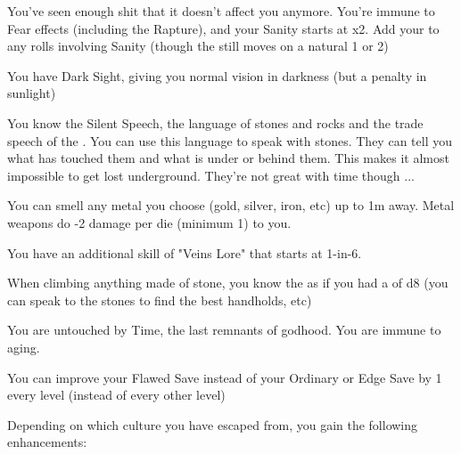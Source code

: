 {  

  You've seen enough shit that it doesn't affect you anymore.  You're immune to Fear effects (including the Rapture), and your Sanity starts at \DCUP x2.  Add your \LVL to any rolls involving Sanity (though the \UD still moves \DCDOWN on a natural 1 or 2)

  You have Dark Sight, giving you normal vision in darkness (but a penalty in sunlight)

  You know the Silent Speech, the language of stones and rocks and the trade speech of the .  You can use this language to speak with stones. They can tell you what has touched them and what is under or behind them.  This makes it almost impossible to get lost underground. They're not great with time though ...

  You can smell any metal you choose (gold, silver, iron, etc) up to 1m away.  Metal weapons do -2 damage per die (minimum 1) to you.  

  You have an additional skill of "Veins Lore" that starts at 1-in-6. 



  When climbing anything made of stone, you know the  as if you had a \KNAVE of d8 (you can speak to the stones to find the best handholds, etc)

  You are untouched by Time, the last remnants of godhood.  You are immune to aging.

  You can improve your Flawed Save instead of your Ordinary or Edge Save by 1 every level (instead of every other level)

  Depending on which culture you have escaped from, you gain the following enhancements:

}
